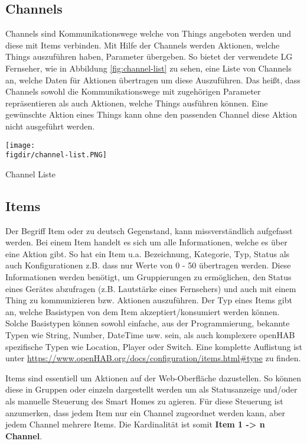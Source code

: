\subsection{Channels} \label{sec:channels}
{
Channels sind Kommunikationswege welche von Things angeboten werden und diese mit Items verbinden. Mit Hilfe der Channels werden Aktionen, welche Things auszuführen haben, Parameter übergeben. So bietet der verwendete LG Fernseher, wie in Abbildung \ref{fig:channel-list} zu sehen, eine Liste von Channels an, welche Daten für Aktionen übertragen um diese Auszuführen. Das heißt, dass Channels sowohl die Kommunikationswege mit zugehörigen Parameter repräsentieren als auch Aktionen, welche Things ausführen können. Eine gewünschte Aktion eines Things kann ohne den passenden Channel diese Aktion nicht ausgeführt werden.
}

{
	\centering
	\captionsetup{type=figure}
	\texttt{[image: \\figdir/channel-list.PNG]}
	\caption{Channel Liste\label{fig:channel-list}}
}

\subsection{Items}
Der Begriff Item oder zu deutsch Gegenstand, kann missverständlich aufgefasst werden. Bei einem Item handelt es sich um alle Informationen, welche es über eine Aktion gibt. So hat ein Item u.a. Bezeichnung, Kategorie, Typ, Status als auch Konfigurationen z.B. dass nur Werte von 0 - 50 übertragen werden. Diese Informationen werden benötigt, um Gruppierungen zu ermöglichen, den Status eines Gerätes abzufragen (z.B. Lautstärke eines Fernsehers) und auch mit einem Thing zu kommunizieren bzw. Aktionen auszuführen. Der Typ eines Items gibt an, welche Basistypen von dem Item akzeptiert/konsumiert werden können. Solche Basistypen können sowohl einfache, aus der Programmierung, bekannte Typen wie String, Number, DateTime usw. sein, als auch komplexere openHAB spezifische Typen wie Location, Player oder Switch. Eine komplette Auflistung ist unter \url{https://www.openHAB.org/docs/configuration/items.html#type} zu finden.

Items sind essentiell um Aktionen auf der Web-Oberfläche dazustellen. So können diese in Gruppen oder einzeln dargestellt werden um als Statusanzeige und/oder als manuelle Steuerung des Smart Homes zu agieren. Für diese Steuerung ist anzumerken, dass jedem Item nur ein Channel zugeordnet werden kann, aber jedem Channel mehrere Items. Die Kardinalität ist somit \textbf{Item 1 -> n Channel}.

